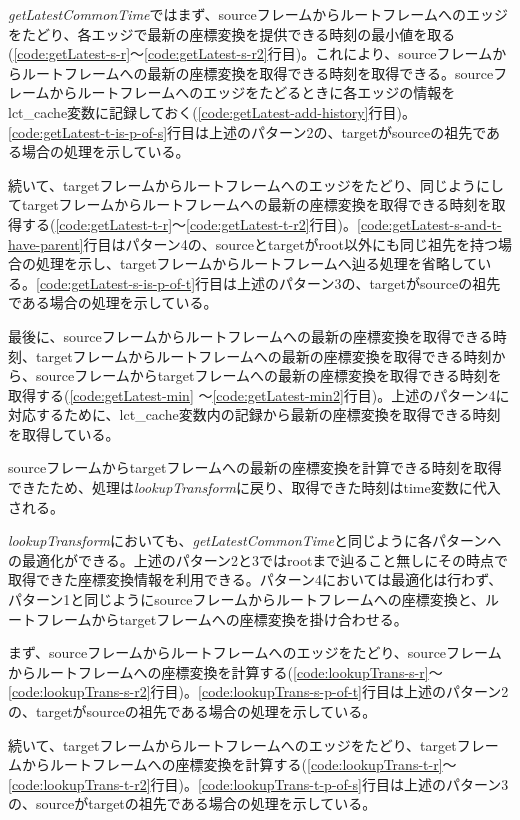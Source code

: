 \documentclass[a4paper]{jreport}	%
\begin{document}
\textit{getLatestCommonTime}ではまず、sourceフレームからルートフレームへのエッジをたどり、各エッジで最新の座標変換を提供できる時刻の最小値を取る(\ref{code:getLatest-s-r}〜\ref{code:getLatest-s-r2}行目)。これにより、sourceフレームからルートフレームへの最新の座標変換を取得できる時刻を取得できる。sourceフレームからルートフレームへのエッジをたどるときに各エッジの情報をlct\_cache変数に記録しておく(\ref{code:getLatest-add-history}行目)。\ref{code:getLatest-t-is-p-of-s}行目は上述のパターン2の、targetがsourceの祖先である場合の処理を示している。

続いて、targetフレームからルートフレームへのエッジをたどり、同じようにしてtargetフレームからルートフレームへの最新の座標変換を取得できる時刻を取得する(\ref{code:getLatest-t-r}〜\ref{code:getLatest-t-r2}行目)。\ref{code:getLatest-s-and-t-have-parent}行目はパターン4の、sourceとtargetがroot以外にも同じ祖先を持つ場合の処理を示し、targetフレームからルートフレームへ辿る処理を省略している。\ref{code:getLatest-s-is-p-of-t}行目は上述のパターン3の、targetがsourceの祖先である場合の処理を示している。

最後に、sourceフレームからルートフレームへの最新の座標変換を取得できる時刻、targetフレームからルートフレームへの最新の座標変換を取得できる時刻から、sourceフレームからtargetフレームへの最新の座標変換を取得できる時刻を取得する(\ref{code:getLatest-min} 〜\ref{code:getLatest-min2}行目)。上述のパターン4に対応するために、lct\_cache変数内の記録から最新の座標変換を取得できる時刻を取得している。

sourceフレームからtargetフレームへの最新の座標変換を計算できる時刻を取得できたため、処理は\textit{lookupTransform}に戻り、取得できた時刻はtime変数に代入される。

\textit{lookupTransform}においても、\textit{getLatestCommonTime}と同じように各パターンへの最適化ができる。上述のパターン2と3ではrootまで辿ること無しにその時点で取得できた座標変換情報を利用できる。パターン4においては最適化は行わず、パターン1と同じようにsourceフレームからルートフレームへの座標変換と、ルートフレームからtargetフレームへの座標変換を掛け合わせる。

まず、sourceフレームからルートフレームへのエッジをたどり、sourceフレームからルートフレームへの座標変換を計算する(\ref{code:lookupTrans-s-r}〜\ref{code:lookupTrans-s-r2}行目)。\ref{code:lookupTrans-s-p-of-t}行目は上述のパターン2の、targetがsourceの祖先である場合の処理を示している。

続いて、targetフレームからルートフレームへのエッジをたどり、targetフレームからルートフレームへの座標変換を計算する(\ref{code:lookupTrans-t-r}〜\ref{code:lookupTrans-t-r2}行目)。\ref{code:lookupTrans-t-p-of-s}行目は上述のパターン3の、sourceがtargetの祖先である場合の処理を示している。
\end{document}
